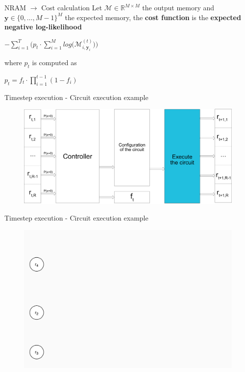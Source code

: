 \documentclass[xcolor={usenames}]{beamer}
\begin{document}
  \begin{frame}{NRAM \(\rightarrow\) Cost calculation}
  	Let $\mathcal{M} \in \mathbb{R}^{M \times M}$ the output memory and $\textbf{y} \in \{0, \dots, M - 1\}^M$ the expected memory, the \textbf{cost function} is the \textbf{expected negative log-likelihood}
  	\begin{center}
  		$-\sum\limits_{i=1}^{T}\Bigg(p_{t}\cdot\sum\limits_{i=1}^{M}log\Big(\mathcal{M}_{i, \textbf{y}_{i}}^{(t)}\Big)\Bigg)$
  	\end{center}
  	where $p_t$ is computed as
	\begin{center}
		$p_{t} = f_{t} \cdot \prod\limits_{i=1}^{t-1}(1 - f_{i})$
	\end{center}
  \end{frame}
  
  \iffalse
  \begin{frame}{Timestep execution - Circuit execution example}
  	\begin{figure}
  		\centering
  		\includegraphics[width=\textwidth]{../figures/timestep-nram-without-memory-execution-CIRCUIT.png}
  	\end{figure}
  \end{frame}
  \begin{frame}{Timestep execution - Circuit execution example}
  	\begin{figure}
  		\centering
  		\includegraphics[width=\textwidth]{../figures/example-circuit-0.png}
  	\end{figure}
  \end{frame}
\end{document}
